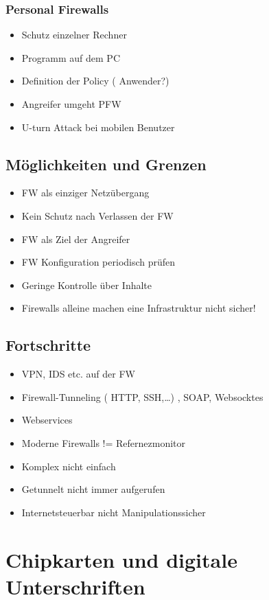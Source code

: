 \subsubsection*{ Personal Firewalls }
\begin{itemize}
	\item Schutz einzelner Rechner
	\item Programm auf dem PC
	\item Definition der Policy ( Anwender?)
	\item Angreifer umgeht PFW
	\item U-turn Attack bei mobilen Benutzer
\end{itemize}

\subsection*{ Möglichkeiten und Grenzen }
\begin{itemize}
	\item FW als einziger Netzübergang 
	\item Kein Schutz nach Verlassen der FW
	\item FW als Ziel der Angreifer
	\item FW Konfiguration periodisch prüfen
	\item Geringe Kontrolle über Inhalte
	\item Firewalls alleine machen eine Infrastruktur nicht sicher!
\end{itemize}


\subsection*{  Fortschritte }
\begin{itemize}
	\item VPN, IDS etc. auf der FW
	\item Firewall-Tunneling ( HTTP, SSH,…) , SOAP, Websocktes
	\item Webservices
	\item Moderne Firewalls != Refernezmonitor
	\item Komplex nicht einfach
	\item Getunnelt nicht immer aufgerufen
	\item Internetsteuerbar nicht Manipulationssicher
\end{itemize}



\section*{Chipkarten und digitale Unterschriften}

